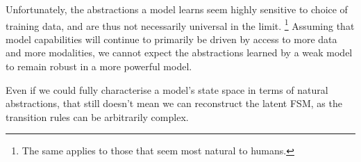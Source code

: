 Unfortunately, the abstractions a model learns seem highly sensitive to choice of training data, and are thus not necessarily universal in the limit.
\footnote{The same applies to those that seem most natural to humans.}
Assuming that model capabilities will continue to primarily be driven by access to more data and more modalities, we cannot expect the abstractions learned by a weak model to remain robust in a more powerful model.

Even if we could fully characterise a model's state space in terms of natural abstractions,
that still doesn't mean we can reconstruct the latent FSM, 
as the transition rules can be arbitrarily complex.

